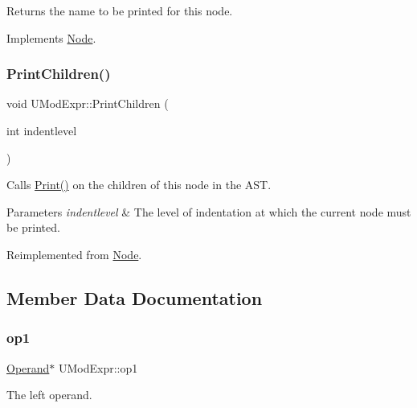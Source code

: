 Returns the name to be printed for this node. 

Implements \hyperlink{class_node_a56e29657306ffb004d69c6929ae44269}{Node}.

\mbox{\label{class_u_mod_expr_a77b079d55fdc1f8bd1e8266edc6959ea}} 
\subsubsection{\texorpdfstring{Print\+Children()}{PrintChildren()}}
{\footnotesize\ttfamily void U\+Mod\+Expr\+::\+Print\+Children (\begin{DoxyParamCaption}\item[{int}]{indentlevel }\end{DoxyParamCaption})\hspace{0.3cm}{\ttfamily [virtual]}}

Calls \hyperlink{class_node_a9ef727fd72d1a37792b3db60a8a479dd}{Print()} on the children of this node in the A\+ST. 
\begin{DoxyParams}{Parameters}
{\em indentlevel} & The level of indentation at which the current node must be printed. \\
\hline
\end{DoxyParams}


Reimplemented from \hyperlink{class_node_a3e67ec8d22182b721717af14fe0c3000}{Node}.



\subsection{Member Data Documentation}
\mbox{\label{class_u_mod_expr_a28a8e54f87b32fe6bd6cd594f2a5d6ac}} 
\subsubsection{\texorpdfstring{op1}{op1}}
{\footnotesize\ttfamily \hyperlink{class_operand}{Operand}$\ast$ U\+Mod\+Expr\+::op1\hspace{0.3cm}{\ttfamily [protected]}}

The left operand. \mbox{\label{class_u_mod_expr_a1c5fedbdc12e07f75acabffde2a56fa1}} 
